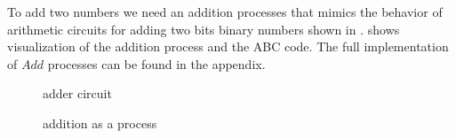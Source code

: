 To add two numbers we need an addition processes that mimics the behavior of arithmetic circuits for adding two bits binary numbers shown in 
.
 shows visualization of the addition process and the ABC code.
The full implementation of $Add$ processes can be found in the appendix.
\begin{figure}[H]%
\centering
{}
\caption{adder circuit}
\label{tra_adder_circuit}%
\end{figure}


\begin{figure}[H]%
\centering
{}%
\hspace{\fill}
%
\hspace{1em}%
%
\caption{addition as a process}
\label{tra_addition}%
\end{figure}
